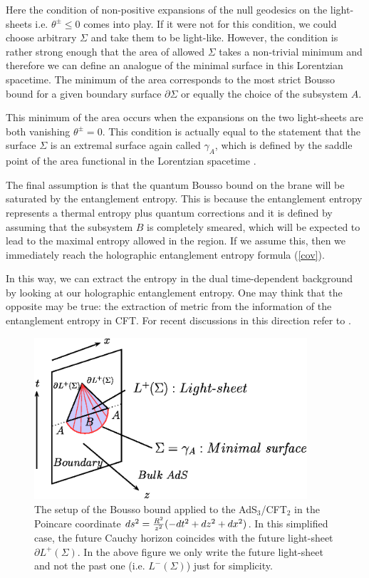 \documentclass[12pt]{article}
\def\frac#1#2{{#1\over #2}}
\def\frac#1#2{{#1\over #2}}
\begin{document}
Here the condition of non-positive expansions of the null geodesics
on the light-sheets i.e. $\theta^\pm \leq 0$ comes into play. If
it were not for this condition, we could choose arbitrary $\Sigma$ and
take them to be light-like. However, the condition is rather
strong enough that the area of allowed $\Sigma$ takes a non-trivial
minimum and therefore we can define an analogue of the minimal
surface in this Lorentzian spacetime. The minimum of the area
corresponds to the most strict Bousso bound for a given boundary
surface $\partial \Sigma$ or equally the choice of the subsystem
$A$.

This minimum of the area occurs when the expansions on the two
light-sheets are both vanishing $\theta^\pm=0$. This condition is
actually equal to the statement that the surface $\Sigma$ is an
extremal surface again called $\gamma_A$, which is defined by the
saddle point of the area functional in the Lorentzian spacetime
\cite{Hubeny:2007xt}.

The final assumption is that the quantum Bousso bound on the brane
will be saturated by the entanglement entropy. This is because
 the entanglement entropy represents a thermal entropy
plus quantum corrections and it is defined by assuming that the
subsystem $B$ is completely smeared, which will be expected to lead
to the maximal entropy allowed in the region. If we assume this,
then we immediately reach the holographic entanglement entropy
formula (\ref{cov}).

In this way, we can extract the entropy in the dual
time-dependent background
by looking at our holographic entanglement entropy.
One may think that the opposite may be true: the extraction of metric from the information of
the entanglement entropy in CFT. For recent discussions in this direction refer to
\cite{Hammersley:2007ab,Bilson:2008ab}.

\begin{figure}
\begin{center}
\includegraphics[height=6cm,clip]{covariant.eps}
\end{center}
\caption{ \label{bousso.eps} The setup of the Bousso bound applied to
the AdS$_3$/CFT$_2$ in the Poincare coordinate
$ds^2=\frac{R^2}{z^2}(-dt^2+dz^2+dx^2)$. In this simplified case,
the future Cauchy horizon coincides with the future
light-sheet $\partial L^+(\Sigma)$. In the above figure we only
write the future light-sheet and not the past one (i.e. $L^-(\Sigma)$)
just for simplicity.}
\end{figure}
\end{document}

